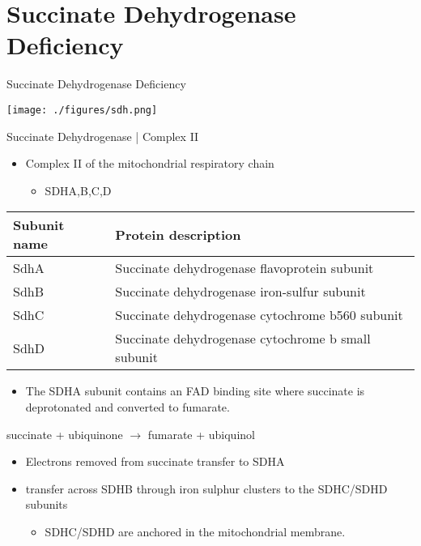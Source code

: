 \documentclass[presentation, smaller]{beamer}
\begin{document}
\section{Succinate Dehydrogenase Deficiency}
\label{sec:orgab7e3ae}

\begin{frame}[label={sec:org6f696c6}]{Succinate Dehydrogenase Deficiency}
\begin{center}
\texttt{[image: ./figures/sdh.png]}
\end{center}
\end{frame}

\begin{frame}[label={sec:orgcee4d6e}]{Succinate Dehydrogenase | Complex II}
\begin{itemize}
\item Complex II of the mitochondrial respiratory chain
\begin{itemize}
\item SDHA,B,C,D
\end{itemize}
\end{itemize}

\begin{center}
\begin{tabular}{ll}
Subunit name & Protein description\\
\hline
SdhA & Succinate dehydrogenase flavoprotein subunit\\
SdhB & Succinate dehydrogenase iron-sulfur subunit\\
SdhC & Succinate dehydrogenase cytochrome b560 subunit\\
SdhD & Succinate dehydrogenase cytochrome b small subunit\\
\end{tabular}
\end{center}

\begin{itemize}
\item The SDHA subunit contains an FAD binding site where succinate
is deprotonated and converted to fumarate.
\end{itemize}

succinate + ubiquinone \(\to\) fumarate + ubiquinol

\begin{itemize}
\item Electrons removed from succinate transfer to SDHA
\item transfer across SDHB through iron sulphur clusters to the SDHC/SDHD subunits
\begin{itemize}
\item SDHC/SDHD are anchored in the mitochondrial membrane.
\end{itemize}
\end{itemize}
\end{frame}
\end{document}

